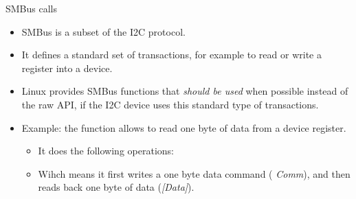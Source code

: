 \begin{frame}{SMBus calls}
  \begin{itemize}
  \item SMBus is a subset of the I2C protocol.
  \item It defines a standard set of transactions, for example to read
    or write a register into a device.
  \item Linux provides SMBus functions that {\em should be used} when
    possible instead of the raw API, if the I2C device uses this
    standard type of transactions.
  \item Example: the  function allows
    to read one byte of data from a device register.
    \begin{itemize}
    \item It does the following operations:
    \item Wihch means it first writes a one byte data command ({\em
        Comm}), and then reads back one byte of data ({\em [Data]}).
    \end{itemize}
  \end{itemize}
\end{frame}

